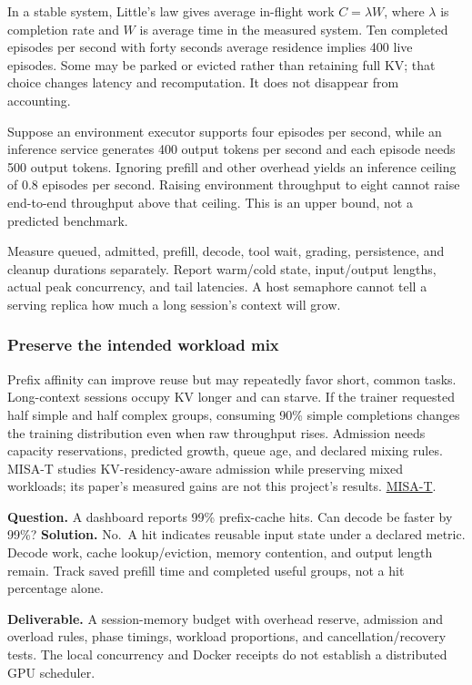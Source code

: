 \documentclass[
  11pt,
  letterpaper,
]{article}
\begin{document}
In a stable system, Little's law gives average in-flight work
\(C=\lambda W\), where \(\lambda\) is completion rate and \(W\) is
average time in the measured system. Ten completed episodes per second
with forty seconds average residence implies 400 live episodes. Some may
be parked or evicted rather than retaining full KV; that choice changes
latency and recomputation. It does not disappear from accounting.

Suppose an environment executor supports four episodes per second, while
an inference service generates 400 output tokens per second and each
episode needs 500 output tokens. Ignoring prefill and other overhead
yields an inference ceiling of 0.8 episodes per second. Raising
environment throughput to eight cannot raise end-to-end throughput above
that ceiling. This is an upper bound, not a predicted benchmark.

Measure queued, admitted, prefill, decode, tool wait, grading,
persistence, and cleanup durations separately. Report warm/cold state,
input/output lengths, actual peak concurrency, and tail latencies. A
host semaphore cannot tell a serving replica how much a long session's
context will grow.

\subsubsection{Preserve the intended workload
mix}\label{preserve-the-intended-workload-mix}

Prefix affinity can improve reuse but may repeatedly favor short, common
tasks. Long-context sessions occupy KV longer and can starve. If the
trainer requested half simple and half complex groups, consuming 90\%
simple completions changes the training distribution even when raw
throughput rises. Admission needs capacity reservations, predicted
growth, queue age, and declared mixing rules. MISA-T studies
KV-residency-aware admission while preserving mixed workloads; its
paper's measured gains are not this project's results.
\href{https://arxiv.org/abs/2608.11152v1}{MISA-T}.

\textbf{Question.} A dashboard reports 99\% prefix-cache hits. Can
decode be faster by 99\%? \textbf{Solution.} No.~A hit indicates
reusable input state under a declared metric. Decode work, cache
lookup/eviction, memory contention, and output length remain. Track
saved prefill time and completed useful groups, not a hit percentage
alone.

\textbf{Deliverable.} A session-memory budget with overhead reserve,
admission and overload rules, phase timings, workload proportions, and
cancellation/recovery tests. The local concurrency and Docker receipts
do not establish a distributed GPU scheduler.
\end{document}

